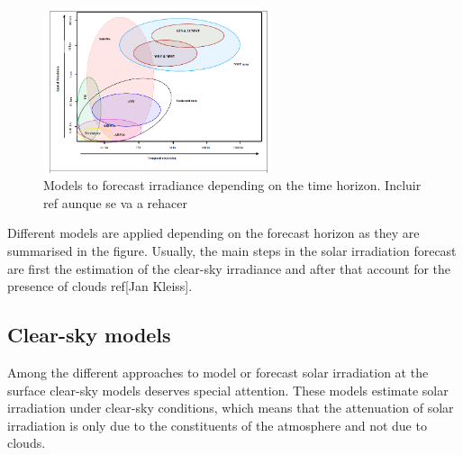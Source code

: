 \begin{figure}[h!]
\centering\includegraphics[width=0.6\textwidth]{figs/forecast.png}
\caption{Models to forecast irradiance depending on the time horizon. Incluir ref aunque se va a rehacer}
\label{fig:forecast}
\end{figure}


Different models are applied depending on the forecast horizon as they are summarised in the figure. Usually, the main steps in the solar irradiation forecast are first the estimation of the clear-sky irradiance and after that account for the presence of clouds ref[Jan Kleiss].



\subsection{Clear-sky models}

Among the different approaches to model or forecast solar irradiation at the surface clear-sky models deserves special attention. These models estimate solar irradiation under clear-sky conditions, which means that the attenuation of solar irradiation is only due to the constituents of the atmosphere and not due to clouds.

